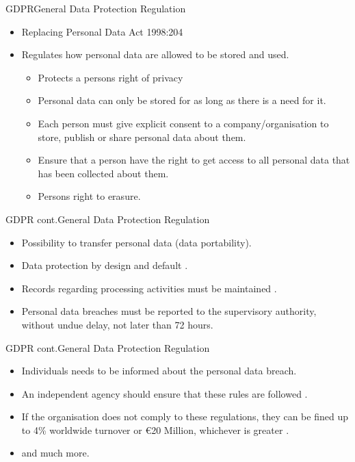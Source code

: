 \documentclass{beamer}
\begin{document}
\begin{frame}{GDPR}{General Data Protection Regulation}
  \begin{itemize}
    \item Replacing Personal Data Act 1998:204
    \item Regulates how personal data are allowed to be stored and used.
      \begin{itemize}
        \item Protects a persons right of privacy\cite[art. 5]{eu:gdpr}
        \item Personal data can only be stored for as long as there is a need
          for it\cite[art. 5]{eu:gdpr}.
        \item Each person must give explicit consent to a company/organisation
          to store, publish or share personal data about them\cite[art.
          7]{eu:gdpr}.  
        \item Ensure that a person have the right to get access
          to all personal
          data that has been collected about them\cite[art. 15]{eu:gdpr}.
        \item Persons right to erasure\cite[art. 17]{eu:gdpr}. 
      \end{itemize}
  \end{itemize}
\end{frame}
\begin{frame}{GDPR cont.}{General Data Protection Regulation}
    \begin{itemize}
      \item Possibility to transfer personal data (data
          portability)\cite[art. 20]{eu:gdpr}.  
      \item Data protection by design and default \cite[art. 25]{eu:gdpr}.
      \item Records regarding processing activities must be maintained \cite[art.
        30]{eu:gdpr}.
      \item Personal data breaches must be reported to the supervisory
        authority, without undue delay, not later than 72 hours\cite[art.
        33]{eu:gdpr}.
    \end{itemize}
\end{frame}
\begin{frame}{GDPR cont.}{General Data Protection Regulation}
\begin{itemize}
    \item Individuals needs to be informed about the personal data
        breach\cite[art. 34]{eu:gdpr}.
    \item An independent agency should ensure that these rules are followed
      \cite[art 51]{eu:gdpr}.
    \item If the organisation does not comply to these regulations, they can be
      fined up to 4\% worldwide turnover or \euro{}20 Million, whichever is greater
      \cite[art 83]{eu:gdpr}.
    \item and much more.
\end{itemize}
\end{frame}
\end{document}

